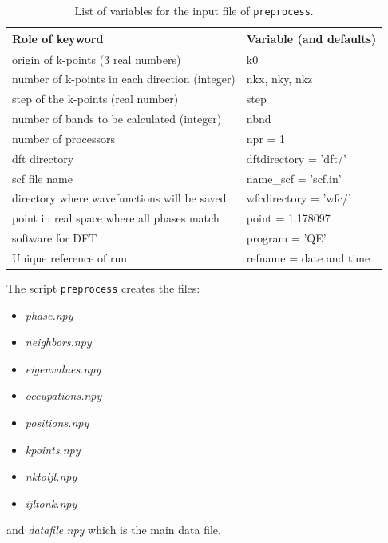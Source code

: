 \documentclass[a4paper,12pt]{report}
\begin{document}
\begin{table}[h]
 \centering
 \caption{List of variables for the input file of \texttt{preprocess}.}

 \begin{tabularx}{\textwidth}{Xl}
 \textbf{Role of keyword}                     & \textbf{Variable (and defaults)}\\
\hline
 origin of k-points (3 real numbers)           & k0 \\
 number of k-points in each direction (integer)& nkx, nky, nkz \\
 step of the k-points (real number)            & step \\
 number of bands to be calculated (integer)    & nbnd \\
 \hline
 number of processors                         & npr = 1 \\
 dft directory                                & dftdirectory = 'dft/' \\
 scf file name                                & name\_scf = 'scf.in' \\
 directory where wavefunctions will be saved  & wfcdirectory = 'wfc/' \\
 point in real space where all phases match   & point = 1.178097 \\
 software for DFT                             & program = 'QE' \\
 Unique reference of run                      & refname = date and time \\
 \hline
\end{tabularx}
 \label{tab:variables_preprocessing}
\end{table}





The script \texttt{preprocess} creates the files:
\begin{itemize}
 \item \emph{phase.npy}
 \item \emph{neighbors.npy}
 \item \emph{eigenvalues.npy}
 \item \emph{occupations.npy}
 \item \emph{positions.npy}
 \item \emph{kpoints.npy}
 \item \emph{nktoijl.npy}
 \item \emph{ijltonk.npy}
\end{itemize}
and \emph{datafile.npy} which is the main data file.
\end{document}
